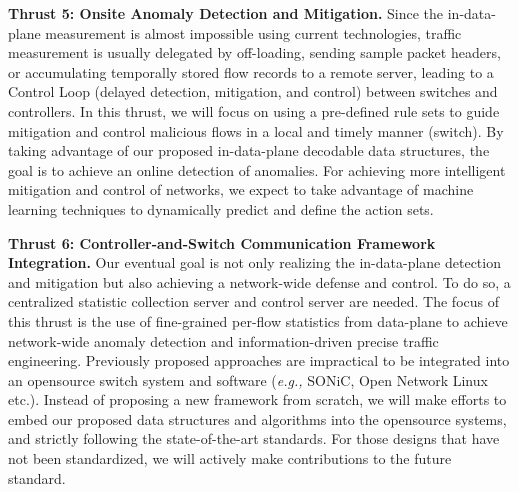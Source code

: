 \documentclass{NSF}
\newcommand{\BfPara}[1]{{\noindent\textbf{#1.}}\xspace}
\newcommand{\etc}{{etc.}\xspace}
\newcommand{\eg}{{\em e.g.,}\xspace}
\begin{document}
   
 

\BfPara{Thrust 5: Onsite Anomaly Detection and Mitigation}
Since the in-data-plane measurement is almost impossible using current technologies, traffic measurement is usually delegated by off-loading, sending sample packet headers, or accumulating temporally stored flow records to a remote server, leading to a Control Loop (delayed detection, mitigation, and control) between switches and controllers. In this thrust, we will focus on using a pre-defined rule sets to guide mitigation and control malicious flows in a local and timely manner (switch). By taking advantage of our proposed in-data-plane decodable data structures, the goal is to achieve an online detection of anomalies. For achieving more intelligent mitigation and control of networks, we expect to take advantage of machine learning techniques to dynamically predict and define the action sets.

\BfPara{Thrust 6: Controller-and-Switch Communication Framework Integration}
Our eventual goal is not only realizing the in-data-plane detection and mitigation but also achieving a network-wide defense and control. To do so, a centralized statistic collection server and control server are needed. The focus of this thrust is the use of fine-grained per-flow statistics from data-plane to achieve network-wide anomaly detection and information-driven precise traffic engineering. Previously proposed approaches are impractical to be integrated into an opensource switch system and software (\eg SONiC, Open Network Linux \etc). Instead of proposing a new framework from scratch, we will make efforts to embed our proposed data structures and algorithms into the opensource systems, and strictly following the state-of-the-art standards. For those designs that have not been standardized, we will actively make contributions to the future standard. 
\end{document}
